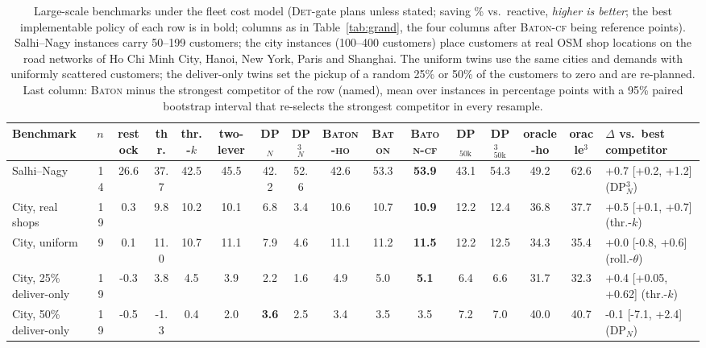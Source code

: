 \begin{table}
\caption{Large-scale benchmarks under the fleet cost model
(\textsc{Det}-gate plans unless stated; saving \% vs.\ reactive,
\emph{higher is better}; the best implementable policy of each row is in
bold; columns as in Table~\ref{tab:grand}, the four columns after
\textsc{Baton-cf} being reference points). Salhi--Nagy instances carry
50--199 customers; the city instances (100--400 customers) place
customers at real OSM shop locations on the road networks of Ho Chi Minh
City, Hanoi, New York, Paris and Shanghai. The uniform twins use the
same cities and demands with uniformly scattered customers; the
deliver-only twins set the pickup of a random 25\% or 50\% of the
customers to zero and are re-planned. Last column: \textsc{Baton} minus
the strongest competitor of the row (named), mean over instances in
percentage points with a 95\% paired bootstrap interval that re-selects
the strongest competitor in every resample.}
\label{tab:large}
\centering
\small
\setlength{\tabcolsep}{3pt}
\begin{adjustbox}{max width=\linewidth}
\begin{tabular}{l r cccccc ccc cccc l}
\toprule
Benchmark & $n$ & restock & thr. & thr.-$k$ & two-lever & DP$_N$ & DP$^3_N$ &
\textsc{Baton-ho} & \textsc{Baton} & \textsc{Baton-cf} &
DP$_{50\mathrm{k}}$ & DP$^3_{50\mathrm{k}}$ & oracle-ho & oracle$^3$ &
$\Delta$ vs.\ best competitor \\
\midrule
Salhi--Nagy & 14 & 26.6 & 37.7 & 42.5 & 45.5 & 42.2 & 52.6 & 42.6 & 53.3 & \textbf{53.9} & 43.1 & 54.3 & 49.2 & 62.6 & +0.7 [+0.2, +1.2] (DP$^3_N$) \\
City, real shops & 19 & 0.3 & 9.8 & 10.2 & 10.1 & 6.8 & 3.4 & 10.6 & 10.7 & \textbf{10.9} & 12.2 & 12.4 & 36.8 & 37.7 & +0.5 [+0.1, +0.7] (thr.-$k$) \\
City, uniform & 9 & 0.1 & 11.0 & 10.7 & 11.1 & 7.9 & 4.6 & 11.1 & 11.2 & \textbf{11.5} & 12.2 & 12.5 & 34.3 & 35.4 & +0.0 [-0.8, +0.6] (roll.-$\theta$) \\
City, 25\% deliver-only & 19 & -0.3 & 3.8 & 4.5 & 3.9 & 2.2 & 1.6 & 4.9 & 5.0 & \textbf{5.1} & 6.4 & 6.6 & 31.7 & 32.3 & +0.4 [+0.05, +0.62] (thr.-$k$) \\
City, 50\% deliver-only & 19 & -0.5 & -1.3 & 0.4 & 2.0 & \textbf{3.6} & 2.5 & 3.4 & 3.5 & 3.5 & 7.2 & 7.0 & 40.0 & 40.7 & -0.1 [-7.1, +2.4] (DP$_N$) \\
\bottomrule
\end{tabular}
\end{adjustbox}
\end{table}
